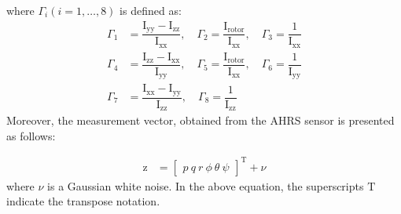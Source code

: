 \documentclass[3p,times]{elsarticle}
\begin{document}
where $\Gamma_i (i = 1, \ldots, 8)$ is defined as:
\begin{equation}
	\begin{split}
		\Gamma_1 &= \dfrac{\mathrm{I}_{\text{yy}} - \mathrm{I}_{\text{zz}}}{\mathrm{I}_{\text{xx}}}, \quad \Gamma_2 = \dfrac{\mathrm{I}_{\text{rotor}}}{\mathrm{I}_{\text{xx}}}, \quad \Gamma_3 = \dfrac{1}{\mathrm{I}_{\text{xx}}}\\ \Gamma_4 &= \dfrac{\mathrm{I}_{\text{zz}} - \mathrm{I}_{\text{xx}}}{\mathrm{I}_{\text{yy}}}, \quad \Gamma_5 = \dfrac{\mathrm{I}_{\text{rotor}}}{\mathrm{I}_{\text{xx}}}, \quad \Gamma_6 = \dfrac{1}{\mathrm{I}_{\text{yy}}} \\ \Gamma_7 &= \dfrac{\mathrm{I}_{\text{xx}} - \mathrm{I}_{\text{yy}}}{\mathrm{I}_{\text{zz}}}, \quad \Gamma_8 = \dfrac{1}{\mathrm{I}_{\text{zz}}}
	\end{split}
\end{equation}
Moreover, the measurement vector, obtained from the AHRS sensor is presented as follows:

\begin{equation}
\begin{split}
\boldsymbol{\mathrm{z}} &= \begin{bmatrix}
p \
q \
r \
\phi \
\theta \
\psi
\end{bmatrix}^\mathrm{T} + \nu
\end{split}
\end{equation}
where $\nu$ is a Gaussian white noise. In the above equation, the superscripts $\mathrm{T}$ indicate the transpose notation.
\end{document}
